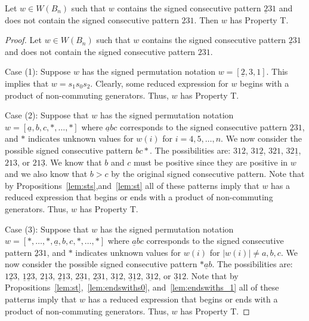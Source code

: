 \begin{proposition}\label{lem:231}
Let $w \in W(B_n)$ such that $w$ contains the signed consecutive pattern $\underline{2}31$ and does not contain the signed consecutive pattern $231$. Then $w$ has Property T.
\begin{proof}
	Let $w \in W(B_n)$ such that $w$ contains the signed consecutive pattern $\underline{2}31$ and does not contain the signed consecutive pattern $231$.
	
	Case (1): Suppose $w$ has the signed permutation notation $w=[\underline{2},3,1]$. This implies that $w=s_1s_0s_2$. Clearly, some reduced expression for $w$ begins with a product of non-commuting generators. Thus, $w$ has Property T.
	
	Case (2): Suppose that $w$ has the signed permutation notation $w=[\underline{a},b,c, \ast, \ldots, \ast]$ where $\underline{a}bc$ corresponds to the signed consecutive pattern $\underline{2}31$, and $\ast$ indicates unknown values for $w(i)$ for $i=4,5, \ldots, n$. We now consider the possible signed consecutive pattern $bc \ast$. The possibilities are: $312$, $31\underline{2}$, $321$, $32\underline{1}$, $213$, or $21\underline{3}$. We know that $b$ and $c$ must be positive since they are positive in $w$ and we also know that $b>c$ by the original signed consecutive pattern. Note that by Propositions~\ref{lem:sts},and~\ref{lem:st} all of these patterns imply that $w$ has a reduced expression that begins or ends with a product of non-commuting generators. Thus, $w$ has Property T.
	
	Case (3): Suppose that $w$ has the signed permutation notation $w=[\ast, \ldots, \ast, \underline{a},b,c, \ast, \ldots, \ast]$ where $\underline{a}bc$ corresponds to the signed consecutive pattern $\underline{2}31$, and $\ast$ indicates unknown values for $w(i)$ for $|w(i)|\neq a,b,c$. We now consider the possible signed consecutive pattern $\ast \underline{a}b$. The possibilities are: $1 \underline{2} 3$, $\underline{1} \underline{2}3$, $2 \underline{1} 3$, $\underline{2} \underline{1} 3$, $2 \underline{3}1$, $\underline{23}1$, $3 \underline{1} 2$, $\underline{3} \underline{1} 2$, $3 \underbar{1}2$, or $\underbar{31}2$. Note that by Propositions~\ref{lem:st},~\ref{lem:endswiths0}, and~\ref{lem:endswiths_1} all of these patterns imply that $w$ has a reduced expression that begins or ends with a product of non-commuting generators. Thus, $w$ has Property T. 
	
\end{proof}	
\end{proposition}


